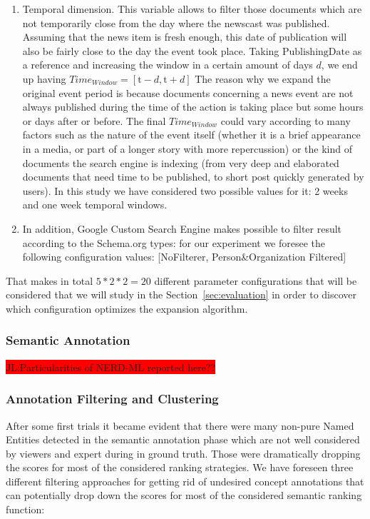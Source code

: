 \documentclass{llncs}
\newcommand{\todo}[1]{\colorbox{red}{#1}}
\begin{document}
\begin{enumerate}
 \item Temporal dimension. This variable allows to filter those documents which are not temporarily close from the day where the newscast was published. Assuming that the news item is fresh enough, this date of publication will also be fairly close to the day the event  took place. Taking $\text{PublishingDate}$ as a reference and increasing the window in a certain amount of days $d$,  we end up having $Time_{Window}=\left [ \text{t}-d, \text{t}+d \right ]$ The reason why we expand the original event period is because documents concerning a news event are not always published during the time of the action is taking place but some hours or days after or before. The final $Time_{Window}$ could vary according to many factors such as the nature of the event itself (whether it is a brief appearance in a media, or part of a longer story with more repercussion) or the kind of documents the search engine is indexing (from very deep and elaborated documents that need time to be published, to short post quickly generated by users). In this study we have considered two possible values for it: 2 weeks and one week temporal windows.
 \item In addition, Google Custom Search Engine makes possible to filter result according to the Schema.org types: for our experiment we foresee the following configuration values: [NoFilterer, Person\&Organization Filtered]
\end{enumerate}

That makes in total $5 * 2 * 2 = 20$ different parameter configurations that will be considered 
that we will study in the Section~\ref{sec:evaluation} in order to discover which configuration optimizes the expansion algorithm.

\subsubsection{Semantic Annotation}
\label{sec:settingsFilteringClustering}
\todo{JL:Particularities of NERD-ML reported here??}

\subsubsection{Annotation Filtering and Clustering}
\label{sec:settingsFilteringClustering}

After some first trials it became evident that there were many non-pure Named Entities detected in the semantic annotation phase which are not well considered by viewers and expert during in ground truth. Those were dramatically dropping the scores for most of the considered ranking strategies. We have foreseen three different filtering approaches for getting rid of undesired concept annotations that can potentially drop down the scores for most of the considered semantic ranking function:
\end{document}
